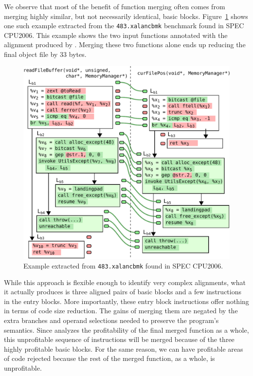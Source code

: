 We observe that most of the benefit of function merging often comes from merging highly similar, but not necessarily identical, basic blocks. Figure~\ref{fig:xalan-example} shows one such example extracted from the \texttt{483.xalancbmk} benchmark found in SPEC CPU2006.
This example shows the two input functions annotated with the alignment produced by \SOAName. Merging these two functions alone ends up reducing the final object file by 33 bytes. 

\begin{figure}[t]
  \centering
  \includegraphics[width=\linewidth]{figs/xalan-example.pdf}
  \caption{Example extracted from \texttt{483.xalancbmk} found in SPEC CPU2006.}
  \label{fig:xalan-example}
\end{figure}


While this approach is flexible enough to identify very complex alignments, what it actually produces is three aligned pairs of basic blocks and a few instructions in the entry blocks. More importantly, these entry block instructions offer nothing in terms of code size reduction. The gains of merging them are negated by the extra branches and operand selections needed to preserve the program's semantics. Since {\SOAName} analyzes the profitability of the final merged function as a whole, this unprofitable sequence of instructions will be merged because of the three highly profitable basic blocks. For the same reason, we can have profitable areas of code rejected because the rest of the merged function, as a whole, is unprofitable.


